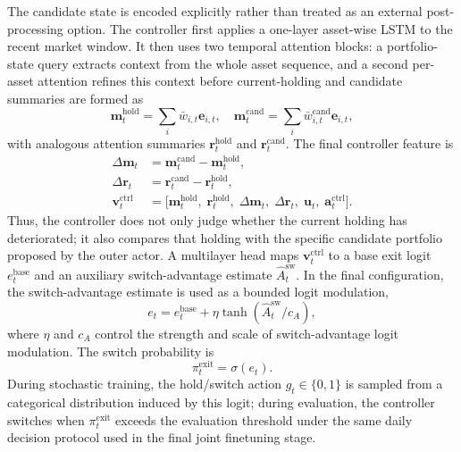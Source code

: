 \documentclass[letterpaper]{article} %
\begin{document}
The candidate state is encoded explicitly rather than treated as an external post-processing option. The controller first applies a one-layer asset-wise LSTM to the recent market window. It then uses two temporal attention blocks: a portfolio-state query extracts context from the whole asset sequence, and a second per-asset attention refines this context before current-holding and candidate summaries are formed as
\[
\mathbf{m}^{\mathrm{hold}}_t=\sum_i \bar{w}_{i,t}\mathbf{e}_{i,t},
\quad
\mathbf{m}^{\mathrm{cand}}_t=\sum_i \bar{w}_{i,t}^{\mathrm{cand}}\mathbf{e}_{i,t},
\]
with analogous attention summaries \(\mathbf{r}^{\mathrm{hold}}_t\) and \(\mathbf{r}^{\mathrm{cand}}_t\). The final controller feature is
\[
\begin{aligned}
\Delta\mathbf{m}_t&=\mathbf{m}^{\mathrm{cand}}_t-\mathbf{m}^{\mathrm{hold}}_t,\\
\Delta\mathbf{r}_t&=\mathbf{r}^{\mathrm{cand}}_t-\mathbf{r}^{\mathrm{hold}}_t,\\
\mathbf{v}^{\mathrm{ctrl}}_t
&=
\bigl[
\mathbf{m}^{\mathrm{hold}}_t,\;
\mathbf{r}^{\mathrm{hold}}_t,\;
\Delta\mathbf{m}_t,\;
\Delta\mathbf{r}_t,\;
\mathbf{u}_t,\;
\mathbf{a}^{\mathrm{ctrl}}_t
\bigr].
\end{aligned}
\]
Thus, the controller does not only judge whether the current holding has deteriorated; it also compares that holding with the specific candidate portfolio proposed by the outer actor. A multilayer head maps \(\mathbf{v}^{\mathrm{ctrl}}_t\) to a base exit logit \(e_t^{\mathrm{base}}\) and an auxiliary switch-advantage estimate \(\widehat{A}^{\mathrm{sw}}_t\). In the final configuration, the switch-advantage estimate is used as a bounded logit modulation,
\[
e_t
=
e_t^{\mathrm{base}}
+\eta\tanh(\widehat{A}^{\mathrm{sw}}_t/c_A),
\]
where \(\eta\) and \(c_A\) control the strength and scale of switch-advantage logit modulation.
The switch probability is
\[
\pi_t^{\mathrm{exit}}=\sigma(e_t).
\]
During stochastic training, the hold/switch action \(g_t\in\{0,1\}\) is sampled from a categorical distribution induced by this logit; during evaluation, the controller switches when \(\pi_t^{\mathrm{exit}}\) exceeds the evaluation threshold under the same daily decision protocol used in the final joint finetuning stage.
\end{document}
